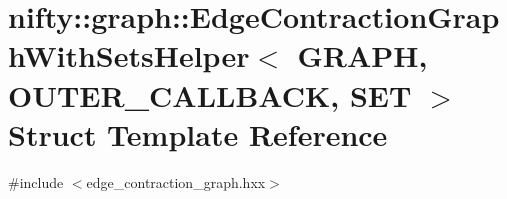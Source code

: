 \hypertarget{structnifty_1_1graph_1_1EdgeContractionGraphWithSetsHelper}{}\section{nifty\+:\+:graph\+:\+:Edge\+Contraction\+Graph\+With\+Sets\+Helper$<$ G\+R\+A\+PH, O\+U\+T\+E\+R\+\_\+\+C\+A\+L\+L\+B\+A\+CK, S\+ET $>$ Struct Template Reference}
\label{structnifty_1_1graph_1_1EdgeContractionGraphWithSetsHelper}


{\ttfamily \#include $<$edge\+\_\+contraction\+\_\+graph.\+hxx$>$}

